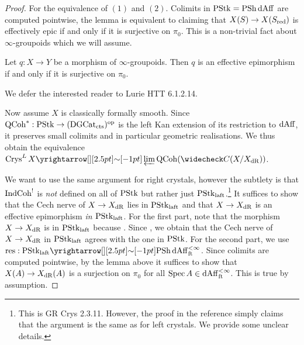 \documentclass[./main.tex]{subfiles}
\begin{document}
\begin{proof}
  
  For the equivalence of $(1)$ and $(2)$.
  Colimits in $\mathrm{PStk} = \mathrm{PSh}\,\mathrm{dAff}$ are computed pointwise,
  the lemma is equivalent to claiming that
  $X(S) \to X(S_{\mathrm{red}})$ is effectively epic if and only if
  it is surjective on $\pi_0$.
  This is a non-trivial fact about $\infty$-groupoids which we will assume.
  \begin{lem}
    
    Let $q : X \to Y$ be a morphism of $\infty$-groupoids.
    Then $q$ is an effective epimorphism if and only if 
    it is surjective on $\pi_0$.
    \begin{proof1}
      We defer the interested reader to Lurie HTT 6.1.2.14.

    \end{proof1}
  \end{lem}

  Now assume $X$ is classically formally smooth.
  Since $\mathrm{QCoh}^* : \mathrm{PStk} \to (\mathrm{DGCat}_{\mathrm{cts}})^{\mathrm{op}}$ is the left Kan extension of
  its restriction to $\mathrm{dAff}$, it preserves small colimits
  and in particular geometric realisations.
  We thus obtain the equivalence 
  $\CRYS^L\,X \map{\sim}{} \LIM \QCOH(\check{C}(X / X_\DR))$.

  We want to use the same argument for right crystals,
  however the subtlety is that $\mathrm{IndCoh}^!$ is 
  \emph{not} defined on all of $\mathrm{PStk}$ but rather just $\mathrm{PStk}_{\mathrm{laft}}$.\footnote{
    This is GR Crys 2.3.11. However, 
    the proof in the reference simply claims that the argument is
    the same as for left crystals.
    We provide some unclear details.
  }
  It suffices to show that the Cech nerve of $X \to X_{\mathrm{dR}}$ lies in $\mathrm{PStk}_{\mathrm{laft}}$
  and that $X \to X_{\mathrm{dR}}$ is an effective epimorphism \emph{in $\mathrm{PStk}_{\mathrm{laft}}$}.
  For the first part,
  note that the morphism $X \to X_{\mathrm{dR}}$ is in $\mathrm{PStk}_{\mathrm{laft}}$ because 
  .
  Since ,
  we obtain that the Cech nerve of $X \to X_{\mathrm{dR}}$ in $\mathrm{PStk}_{\mathrm{laft}}$
  agrees with the one in $\mathrm{PStk}$.
  For the second part, we use 
  {$\mathrm{res} : \PSTK_\LAFT \map{\sim}{} \PSH\,\DAFF^{<\infty}_\FT$}.
  Since colimits are computed pointwise, by the lemma above
  it suffices to show that $X(A) \to X_{\mathrm{dR}}(A)$ is a surjection on $\pi_0$
  for all $\mathrm{Spec}\,A \in \mathrm{dAff}^{< \infty}_{\mathrm{ft}}$.
  This is true by assumption.


\end{proof}
\end{document}
